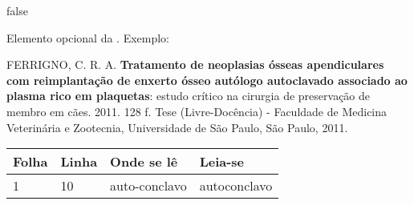 \documentclass[
	12pt,				%
	openright,		%
	oneside,			%
	a4paper,			%
	english,			%
	french,				%
	spanish,			%
	brazil				%
	]{abntex2}
\begin{document}
\if false
\begin{errata}
Elemento opcional da . Exemplo:

\vspace{\onelineskip}

FERRIGNO, C. R. A. \textbf{Tratamento de neoplasias ósseas apendiculares com
reimplantação de enxerto ósseo autólogo autoclavado associado ao plasma
rico em plaquetas}: estudo crítico na cirurgia de preservação de membro em
cães. 2011. 128 f. Tese (Livre-Docência) - Faculdade de Medicina Veterinária e
Zootecnia, Universidade de São Paulo, São Paulo, 2011.

\begin{table}[htb]
\center
\footnotesize
\begin{tabular}{|p{1.4cm}|p{1cm}|p{3cm}|p{3cm}|}
  \hline
   \textbf{Folha} & \textbf{Linha}  & \textbf{Onde se lê}  & \textbf{Leia-se}  \\
    \hline
    1 & 10 & auto-conclavo & autoconclavo\\
   \hline
\end{tabular}
\end{table}

\end{errata}
\fi

\end{document}
